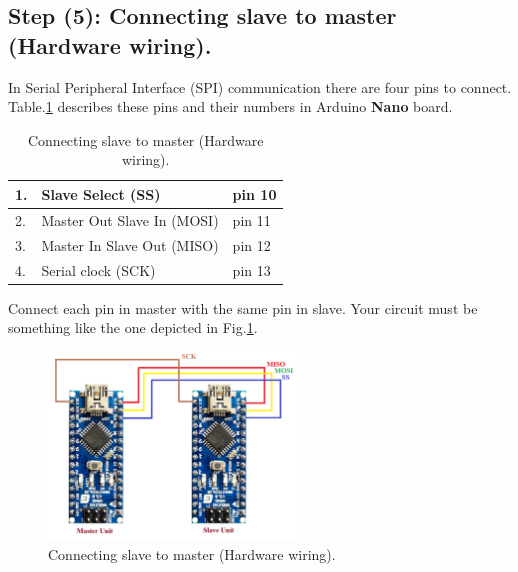 \subsection{Step (5): Connecting slave to master (Hardware wiring).}
In Serial Peripheral Interface (SPI) communication there are four pins to connect. Table.\ref{tbl:ArdMasterConnection} describes these pins and their numbers in Arduino \textbf{Nano} board.
\begin{table}[h]
    \caption{Connecting slave to master (Hardware wiring).}
    \centering
\begin{tabular}{|l|l|l|}  \hline 
    1.  & Slave Select (SS) &  pin 10\\ \hline 
    2. & Master Out Slave In (MOSI) &  pin 11\\  \hline 
    3. & Master In Slave Out (MISO) & pin 12 \\  \hline 
    4.&  Serial clock (SCK)&  pin 13\\   \hline 
\end{tabular} 
        \label{tbl:ArdMasterConnection}
\end{table}

Connect each pin in master with the same pin in slave. Your circuit must be something like the one depicted in Fig.\ref{tbl:wiring}.
\begin{figure}[H]
\centering
\includegraphics[width=0.6\textwidth]{figures/image13}
    \caption{Connecting slave to master (Hardware wiring).}
            \label{tbl:wiring}
\end{figure}

